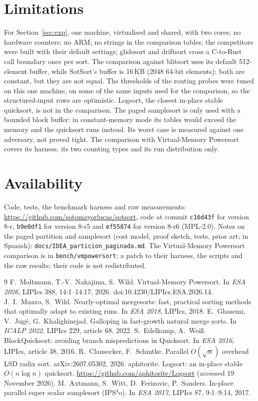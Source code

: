 \documentclass[10pt,a4paper]{article}
\begin{document}
\section{Limitations}
For Section~\ref{sec:exp}, one machine, virtualised and shared, with two cores; no hardware
counters; no ARM; no strings in the comparison tables; the competitors were built with their
default settings; glidesort and driftsort cross a C-to-Rust call boundary once per sort. The
comparison against blitsort uses its default 512-element buffer, while SotSort's buffer is 16\,KB
(2048 64-bit elements): both are constant, but they are not equal. The thresholds of the routing
probes were tuned on this one machine, on some of the same inputs used for the comparison, so the
structured-input rows are optimistic. Logsort, the closest in-place stable quicksort, is not in
the comparison. The paged samplesort is only used with a bounded block buffer: in constant-memory
mode its tables would exceed the memory and the quicksort runs instead. Its worst case is
measured against one adversary, not proved tight. The comparison with Virtual-Memory Powersort
covers its harness, its two counting types and its run distribution only.

\section{Availability}\label{sec:avail}
Code, tests, the benchmark harness and raw measurements: \url{https://github.com/sotomayorlucas/sotsort},
code at commit \texttt{c16d43f} for version 8-r, \texttt{b9e0df1} for version 8-r5 and
\texttt{ef55874} for version 8-r6 (MPL-2.0). Notes on the paged partition and samplesort
(cost model, proof sketch, tests, prior art; in Spanish): \texttt{docs/IDEA\_particion\_paginada.md}.
The Virtual-Memory Powersort comparison is in \texttt{bench/vmpowersort}: a patch to their
harness, the scripts and the raw results; their code is not redistributed.
\begin{thebibliography}{9}\small
{} F.~Moltmann, T.-V.~Nakajima, S.~Wild. Virtual-Memory Powersort. In
  \emph{ESA 2026}, LIPIcs 388, 14:1--14:17, 2026. doi:10.4230/LIPIcs.ESA.2026.14.
 J.~I.~Munro, S.~Wild. Nearly-optimal mergesorts: fast, practical sorting
  methods that optimally adapt to existing runs. In \emph{ESA 2018}, LIPIcs, 2018.
 E.~Ghasemi, V.~Jugé, G.~Khalighinejad. Galloping in fast-growth natural merge
  sorts. In \emph{ICALP 2022}, LIPIcs 229, article 68, 2022.
 S.~Edelkamp, A.~Weiß. BlockQuicksort: avoiding branch mispredictions in
  Quicksort. In \emph{ESA 2016}, LIPIcs, article 38, 2016.
 R.~Clausecker, F.~Schintke. Parallel $O(\sqrt n)$ overhead LSD radix sort.
  arXiv:2607.05302, 2026.
 aphitorite. Logsort: an in-place stable $O(n\log n)$ quicksort.
  \url{https://github.com/aphitorite/Logsort} (accessed 19 November 2026).
 M.~Axtmann, S.~Witt, D.~Ferizovic, P.~Sanders. In-place parallel super scalar
  samplesort (IPS$^4$o). In \emph{ESA 2017}, LIPIcs 87, 9:1--9:14, 2017.
\end{thebibliography}
\end{document}
